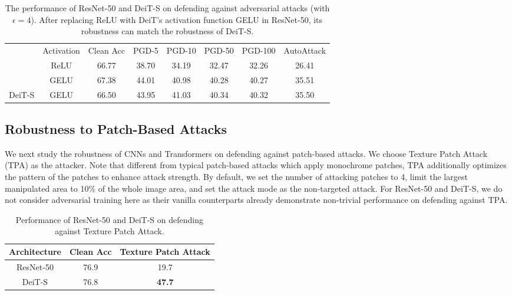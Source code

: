 \documentclass{article}
\begin{document}
\setlength{\tabcolsep}{3pt}
\begin{table}[!ht]
\vspace{-0.25em}
\caption{The performance of ResNet-50 and DeiT-S on defending against adversarial attacks (with $\epsilon=4$). After replacing ReLU with DeiT's activation function GELU in ResNet-50, its robustness can match the robustness of DeiT-S.} 
\footnotesize
\centering
\begin{tabular}{c|c|c|c|c|c|c|c}
\shline
                            & Activation & Clean Acc & PGD-5 & PGD-10 & PGD-50 &PGD-100 & AutoAttack \\ \shline
\multirow{2}{*}{ResNet-50}  & ReLU    &    66.77  &  38.70    &   34.19    &   32.47     &   32.26 & 26.41   \\ 
                            & GELU     &   67.38     &   44.01         &   40.98         &   40.28       & 40.27    & 35.51   \\ \hline
DeiT-S & GELU      & 66.50       &   43.95    &   41.03     &   40.34     &  40.32 & 35.50 \\ \hline
\end{tabular}
\label{tab:activation}
\end{table}



\subsection{Robustness to Patch-Based Attacks} 
We next study the robustness of CNNs and Transformers on defending against patch-based attacks. We choose Texture Patch Attack (TPA) \cite{yang2020patchattack} as the attacker. Note that different from typical patch-based attacks which apply monochrome patches, TPA additionally optimizes the pattern of the patches to enhance attack strength. By default, we set the number of attacking patches to 4, limit the largest manipulated area to 10\% of the whole image area, and set the attack mode as the non-targeted attack. For ResNet-50 and DeiT-S, we do not consider adversarial training here as their vanilla counterparts already demonstrate non-trivial performance on defending against TPA.


\begin{table}[!b]
\vspace{-1.25em}
\caption{Performance of ResNet-50 and DeiT-S on defending against Texture Patch Attack.} 
\footnotesize
\centering
\begin{tabular}{c|c|c}
\shline
Architecture & Clean Acc & Texture Patch Attack \\ \hline
ResNet-50                     &     76.9            &    19.7            \\ 
DeiT-S                    &      76.8              &   \textbf{47.7}              \\ \hline
\end{tabular}
\label{tab:patchattack}
\end{table}
\end{document}
